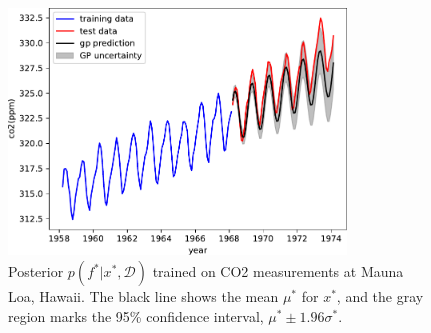 \begin{figure}[htbp]
  \centering
  \includegraphics[width=0.8\textwidth]{./figures/gp_predict.pdf}
  \caption{
    Posterior $p(f^\ast | x^\ast, \mathcal{D})$ trained on
    CO2 measurements at Mauna Loa, Hawaii.
    The black line shows the mean $\mu^\ast$ for $x^\ast$,
    and the gray region marks the 95\% confidence interval,
    $\mu^\ast \pm 1.96 \sigma^\ast$.
  }
  \label{fig:week4:gp:predict}
\end{figure}
